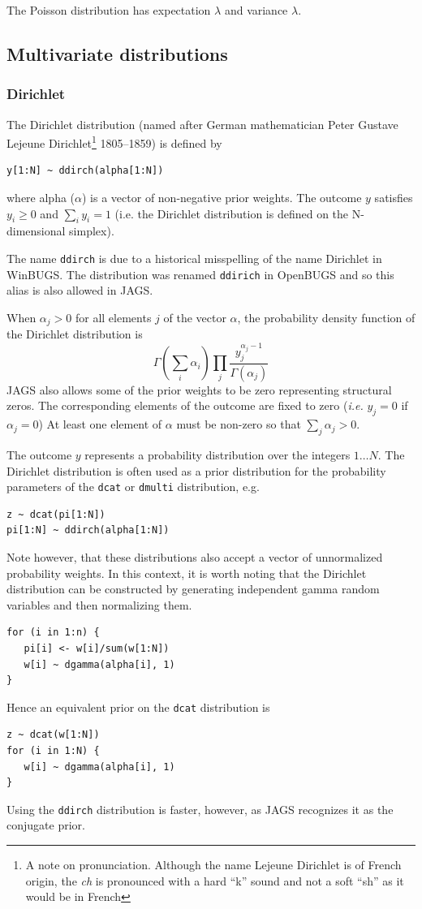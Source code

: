 \documentclass[11pt, a4paper, titlepage]{report}
\begin{document}
{The Poisson distribution has expectation $\lambda$ and variance $\lambda$.

\subsection{Multivariate distributions}

\subsubsection{Dirichlet}
\label{bugs:ddirch}

The Dirichlet distribution (named after German mathematician Peter
Gustave Lejeune Dirichlet\footnote{A note on pronunciation. Although
  the name Lejeune Dirichlet is of French origin, the {\em ch} is
  pronounced with a hard ``k'' sound and not a soft ``sh'' as it would
  be in French} 1805--1859) is defined by
\begin{verbatim}
y[1:N] ~ ddirch(alpha[1:N])
\end{verbatim}
where alpha ($\alpha$) is a vector of non-negative prior weights. The
outcome $y$ satisfies $y_i \geq 0$ and $\sum_i y_i = 1$ (i.e. the
Dirichlet distribution is defined on the N-dimensional simplex).

The name \texttt{ddirch} is due to a historical misspelling of the
name Dirichlet in WinBUGS. The distribution was renamed
\texttt{ddirich} in OpenBUGS and so this alias is also allowed in
JAGS.

When $\alpha_j > 0$ for all elements $j$ of the vector $\alpha$, the
probability density function of the Dirichlet distribution is 
\[
\Gamma(\sum_i \alpha_i) \prod_j 
\frac{\textstyle y_j^{\alpha_j - 1}}{\textstyle \Gamma(\alpha_j)}
\]
JAGS also allows some of the prior weights to be zero representing
structural zeros. The corresponding elements of the outcome are fixed
to zero ({\em i.e.}  $y_j = 0$ if $\alpha_j = 0$) At least one
element of $\alpha$ must be non-zero so that $\sum_j \alpha_j > 0$.

The outcome $y$ represents a probability distribution over the
integers $1 \ldots N$. The Dirichlet distribution is often used as
a prior distribution for the probability parameters of the \texttt{dcat}
or \texttt{dmulti} distribution, e.g.
\begin{verbatim}
z ~ dcat(pi[1:N])
pi[1:N] ~ ddirch(alpha[1:N])
\end{verbatim}
Note however, that these distributions also accept a vector of
unnormalized probability weights. In this context, it is worth noting
that the Dirichlet distribution can be constructed by generating
independent gamma random variables and then normalizing them.
\begin{verbatim}
for (i in 1:n) {
   pi[i] <- w[i]/sum(w[1:N])
   w[i] ~ dgamma(alpha[i], 1)
}
\end{verbatim}
Hence an equivalent prior on the \texttt{dcat} distribution is
\begin{verbatim}
z ~ dcat(w[1:N])
for (i in 1:N) {
   w[i] ~ dgamma(alpha[i], 1)
}
\end{verbatim}
Using the \texttt{ddirch} distribution is faster, however, as
JAGS recognizes it as the conjugate prior.

}
\end{document}
